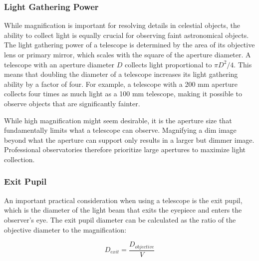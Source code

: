 \documentclass[
  a4paper,
]{book}
\begin{document}
\subsubsection{Light Gathering Power}\label{light-gathering-power}

While magnification is important for resolving details in celestial
objects, the ability to collect light is equally crucial for observing
faint astronomical objects. The light gathering power of a telescope is
determined by the area of its objective lens or primary mirror, which
scales with the square of the aperture diameter. A telescope with an
aperture diameter \(D\) collects light proportional to \(\pi D^2/4\).
This means that doubling the diameter of a telescope increases its light
gathering ability by a factor of four. For example, a telescope with a
200 mm aperture collects four times as much light as a 100 mm telescope,
making it possible to observe objects that are significantly fainter.

\begin{tcolorbox}[enhanced jigsaw, breakable, toptitle=1mm, bottomrule=.15mm, colbacktitle=quarto-callout-note-color!10!white, title=\textcolor{quarto-callout-note-color}{\faInfo}\hspace{0.5em}{Magnification vs.~Aperture}, arc=.35mm, rightrule=.15mm, bottomtitle=1mm, opacityback=0, toprule=.15mm, coltitle=black, leftrule=.75mm, opacitybacktitle=0.6, colback=white, left=2mm, titlerule=0mm, colframe=quarto-callout-note-color-frame]

While high magnification might seem desirable, it is the aperture size
that fundamentally limits what a telescope can observe. Magnifying a dim
image beyond what the aperture can support only results in a larger but
dimmer image. Professional observatories therefore prioritize large
apertures to maximize light collection.

\end{tcolorbox}

\subsubsection{Exit Pupil}\label{exit-pupil}

An important practical consideration when using a telescope is the exit
pupil, which is the diameter of the light beam that exits the eyepiece
and enters the observer's eye. The exit pupil diameter can be calculated
as the ratio of the objective diameter to the magnification:

\[
D_{exit} = \frac{D_{objective}}{V}
\]
\end{document}
